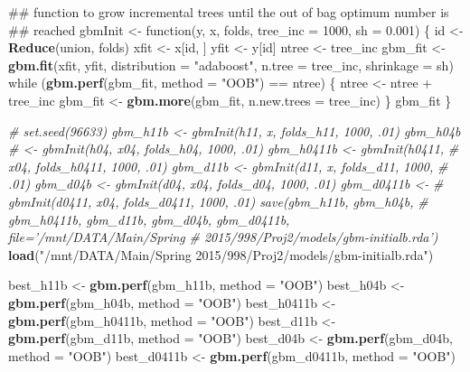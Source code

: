 \documentclass[11pt,]{article}
\newenvironment{Shaded}{\begin{snugshade}}{\end{snugshade}}
\newcommand{\KeywordTok}[1]{\textcolor[rgb]{0.13,0.29,0.53}{\textbf{{#1}}}}
\newcommand{\DataTypeTok}[1]{\textcolor[rgb]{0.13,0.29,0.53}{{#1}}}
\newcommand{\DecValTok}[1]{\textcolor[rgb]{0.00,0.00,0.81}{{#1}}}
\newcommand{\FloatTok}[1]{\textcolor[rgb]{0.00,0.00,0.81}{{#1}}}
\newcommand{\StringTok}[1]{\textcolor[rgb]{0.31,0.60,0.02}{{#1}}}
\newcommand{\CommentTok}[1]{\textcolor[rgb]{0.56,0.35,0.01}{\textit{{#1}}}}
\newcommand{\NormalTok}[1]{{#1}}
\begin{document}
\begin{Shaded}
\begin{Highlighting}[]
{\NormalTok{## function to grow incremental trees until the out of bag optimum number is}
\NormalTok{## reached}
\NormalTok{gbmInit <-}\StringTok{ }\NormalTok{function(y, x, folds, }\DataTypeTok{tree_inc =} \DecValTok{1000}\NormalTok{, }\DataTypeTok{sh =} \FloatTok{0.001}\NormalTok{) \{}
    \NormalTok{id <-}\StringTok{ }\KeywordTok{Reduce}\NormalTok{(union, folds)}
    \NormalTok{xfit <-}\StringTok{ }\NormalTok{x[id, ]}
    \NormalTok{yfit <-}\StringTok{ }\NormalTok{y[id]}
    \NormalTok{ntree <-}\StringTok{ }\NormalTok{tree_inc}
    \NormalTok{gbm_fit <-}\StringTok{ }\KeywordTok{gbm.fit}\NormalTok{(xfit, yfit, }\DataTypeTok{distribution =} \StringTok{"adaboost"}\NormalTok{, }\DataTypeTok{n.tree =} \NormalTok{tree_inc, }
        \DataTypeTok{shrinkage =} \NormalTok{sh)}
    \NormalTok{while (}\KeywordTok{gbm.perf}\NormalTok{(gbm_fit, }\DataTypeTok{method =} \StringTok{"OOB"}\NormalTok{) ==}\StringTok{ }\NormalTok{ntree) \{}
        \NormalTok{ntree <-}\StringTok{ }\NormalTok{ntree +}\StringTok{ }\NormalTok{tree_inc}
        \NormalTok{gbm_fit <-}\StringTok{ }\KeywordTok{gbm.more}\NormalTok{(gbm_fit, }\DataTypeTok{n.new.trees =} \NormalTok{tree_inc)}
    \NormalTok{\}}
    \NormalTok{gbm_fit}
\NormalTok{\}}

\CommentTok{# set.seed(96633) gbm_h11b <- gbmInit(h11, x, folds_h11, 1000, .01) gbm_h04b}
\CommentTok{# <- gbmInit(h04, x04, folds_h04, 1000, .01) gbm_h0411b <- gbmInit(h0411,}
\CommentTok{# x04, folds_h0411, 1000, .01) gbm_d11b <- gbmInit(d11, x, folds_d11, 1000,}
\CommentTok{# .01) gbm_d04b <- gbmInit(d04, x04, folds_d04, 1000, .01) gbm_d0411b <-}
\CommentTok{# gbmInit(d0411, x04, folds_d0411, 1000, .01) save(gbm_h11b, gbm_h04b,}
\CommentTok{# gbm_h0411b, gbm_d11b, gbm_d04b, gbm_d0411b, file='/mnt/DATA/Main/Spring}
\CommentTok{# 2015/998/Proj2/models/gbm-initialb.rda')}
\KeywordTok{load}\NormalTok{(}\StringTok{"/mnt/DATA/Main/Spring 2015/998/Proj2/models/gbm-initialb.rda"}\NormalTok{)}

\NormalTok{best_h11b <-}\StringTok{ }\KeywordTok{gbm.perf}\NormalTok{(gbm_h11b, }\DataTypeTok{method =} \StringTok{"OOB"}\NormalTok{)}
\NormalTok{best_h04b <-}\StringTok{ }\KeywordTok{gbm.perf}\NormalTok{(gbm_h04b, }\DataTypeTok{method =} \StringTok{"OOB"}\NormalTok{)}
\NormalTok{best_h0411b <-}\StringTok{ }\KeywordTok{gbm.perf}\NormalTok{(gbm_h0411b, }\DataTypeTok{method =} \StringTok{"OOB"}\NormalTok{)}
\NormalTok{best_d11b <-}\StringTok{ }\KeywordTok{gbm.perf}\NormalTok{(gbm_d11b, }\DataTypeTok{method =} \StringTok{"OOB"}\NormalTok{)}
\NormalTok{best_d04b <-}\StringTok{ }\KeywordTok{gbm.perf}\NormalTok{(gbm_d04b, }\DataTypeTok{method =} \StringTok{"OOB"}\NormalTok{)}
\NormalTok{best_d0411b <-}\StringTok{ }\KeywordTok{gbm.perf}\NormalTok{(gbm_d0411b, }\DataTypeTok{method =} \StringTok{"OOB"}\NormalTok{)}

}
\end{Highlighting}
\end{Shaded}
\end{document}
